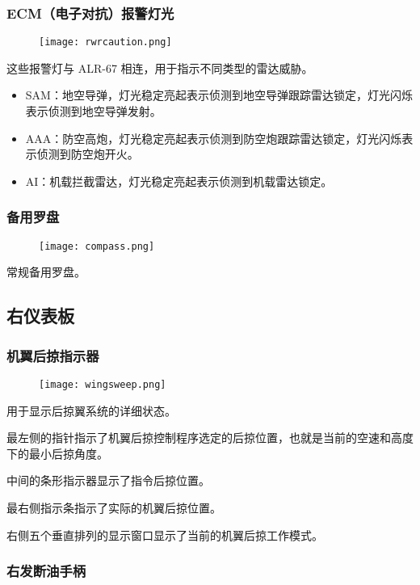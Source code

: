 \subsubsection{ECM（电子对抗）报警灯光}

\begin{figure}[htb]
	\centering
	\texttt{[image: rwrcaution.png]}
\end{figure}
这些报警灯与 ALR-67 相连，用于指示不同类型的雷达威胁。

\begin{itemize}
	\item SAM：地空导弹，灯光稳定亮起表示侦测到地空导弹跟踪雷达锁定，灯光闪烁表示侦测到地空导弹发射。
	\item AAA：防空高炮，灯光稳定亮起表示侦测到防空炮跟踪雷达锁定，灯光闪烁表示侦测到防空炮开火。
	\item AI：机载拦截雷达，灯光稳定亮起表示侦测到机载雷达锁定。
\end{itemize}

\subsubsection{备用罗盘}

\begin{figure}[htb]
	\centering
	\texttt{[image: compass.png]}
\end{figure}
常规备用罗盘。

\subsection{右仪表板}

\subsubsection{机翼后掠指示器}

\begin{figure}[htb]
	\centering
	\texttt{[image: wingsweep.png]}
\end{figure}
用于显示后掠翼系统的详细状态。

最左侧的指针指示了机翼后掠控制程序选定的后掠位置，也就是当前的空速和高度下的最小后掠角度。

中间的条形指示器显示了指令后掠位置。

最右侧指示条指示了实际的机翼后掠位置。

右侧五个垂直排列的显示窗口显示了当前的机翼后掠工作模式。

\subsubsection{右发断油手柄}

